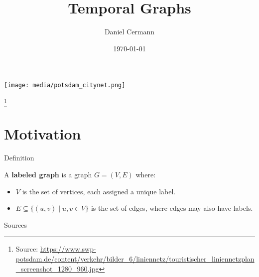 \documentclass{beamer}
\title{Temporal Graphs}
\date{\today}
\author{Daniel Cermann}
\institute{
  \hfill \begin{minipage}{0.3\textwidth}
    \begin{center}
      \texttt{[image: media/hpi\_logo.png]} \newline
      Hasso Plattner Institute 
    \end{center}
  \end{minipage}
}
\newcommand{\sourcefootnote}[1]{\let\thefootnote\relax\footnote{{\tiny Source: \url{#1}}}}
\begin{document}
\begin{frame}
  \begin{center}
    \texttt{[image: media/potsdam\_citynet.png]}
  \end{center}
  \sourcefootnote{https://www.swp-potsdam.de/content/verkehr/bilder_6/liniennetz/touristischer_liniennetzplan_screenshot_1280_960.jpg}
\end{frame}

\maketitle

\section{Motivation}




\begin{frame}{Definition}
    \begin{tcolorbox}[definitionstyle, title=Definition]
        A \textbf{labeled graph} \cite{GHOSH201888} is a graph \( G = (V, E) \) where:
        \begin{itemize}
            \item \( V \) is the set of vertices, each assigned a unique label.
            \item \( E \subseteq \{(u, v) \mid u, v \in V\} \) is the set of edges, where edges may also have labels.
          \end{itemize}
    \end{tcolorbox}
\end{frame}


\begin{frame}{Sources}
  
  
\end{frame}
\end{document}
